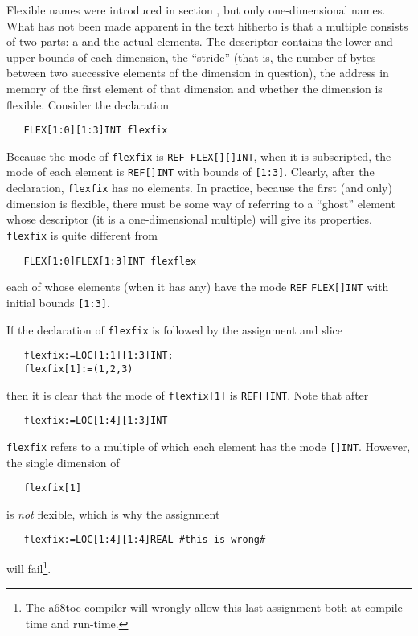 Flexible names were introduced in section , but only
one-dimensional names. What has not been made apparent in the text
hitherto is that a multiple consists of two parts: a
 and the actual elements. The
descriptor contains the lower and upper bounds of each dimension, the
``stride'' (that is, the number of bytes between two successive
elements of the dimension in question), the address in memory of the
first element of that dimension and whether the dimension is
flexible. Consider the declaration
\begin{verbatim}
   FLEX[1:0][1:3]INT flexfix
\end{verbatim}
\noindent
Because the mode of \verb|flexfix| is \verb|REF FLEX[][]INT|, when it
is subscripted, the mode of each element is \verb|REF[]INT| with
bounds of \verb|[1:3]|. Clearly, after the declaration,
\verb|flexfix| has no elements. In practice, because the first (and
only) dimension is flexible, there must be some way of referring to a
``ghost'' element whose descriptor (it is a one-dimensional multiple)
will give its properties. \verb|flexfix| is quite different from
\begin{verbatim}
   FLEX[1:0]FLEX[1:3]INT flexflex
\end{verbatim}
\noindent
each of whose elements (when it has any) have the mode \verb|REF|
\verb|FLEX[]INT| with initial bounds \verb|[1:3]|.

If the declaration of \verb|flexfix| is followed by the assignment
and slice
\begin{verbatim}
   flexfix:=LOC[1:1][1:3]INT;
   flexfix[1]:=(1,2,3)
\end{verbatim}
\noindent
then it is clear that the mode of \verb|flexfix[1]| is \verb|REF[]INT|.
Note that after
\begin{verbatim}
   flexfix:=LOC[1:4][1:3]INT
\end{verbatim}
\noindent
\verb|flexfix| refers to a multiple of which each element has the mode
\verb|[]INT|. However, the single dimension of
\begin{verbatim}
   flexfix[1]
\end{verbatim}
\noindent
is \emph{not} flexible, which is why the assignment
\begin{verbatim}
   flexfix:=LOC[1:4][1:4]REAL #this is wrong#
\end{verbatim}
\noindent
will fail\footnote{The a68toc compiler will wrongly allow this last
assignment both at compile-time and run-time.}.

